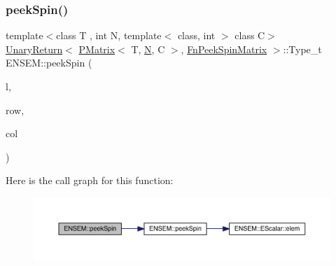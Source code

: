 \subsubsection{\texorpdfstring{peekSpin()}{peekSpin()}\hspace{0.1cm}{\footnotesize\ttfamily [2/2]}}
{\footnotesize\ttfamily template$<$class T , int N, template$<$ class, int $>$ class C$>$ \\
\mbox{\hyperlink{structENSEM_1_1UnaryReturn}{Unary\+Return}}$<$ \mbox{\hyperlink{classENSEM_1_1PMatrix}{P\+Matrix}}$<$ T, \mbox{\hyperlink{adat__devel_2lib_2hadron_2operator__name__util_8cc_a7722c8ecbb62d99aee7ce68b1752f337}{N}}, C $>$, \mbox{\hyperlink{structENSEM_1_1FnPeekSpinMatrix}{Fn\+Peek\+Spin\+Matrix}} $>$\+::Type\+\_\+t E\+N\+S\+E\+M\+::peek\+Spin (\begin{DoxyParamCaption}\item[{const \mbox{\hyperlink{classENSEM_1_1PMatrix}{P\+Matrix}}$<$ T, \mbox{\hyperlink{adat__devel_2lib_2hadron_2operator__name__util_8cc_a7722c8ecbb62d99aee7ce68b1752f337}{N}}, C $>$ \&}]{l,  }\item[{int}]{row,  }\item[{int}]{col }\end{DoxyParamCaption})\hspace{0.3cm}{\ttfamily [inline]}}

Here is the call graph for this function\+:\nopagebreak
\begin{figure}[H]
\begin{center}
\leavevmode
\includegraphics[width=350pt]{df/d0a/group__primmatrix_ga2efe19b2ef4dc4cbacc12117645bf8b8_cgraph}
\end{center}
\end{figure}
\mbox{\label{group__primmatrix_ga0cfeefefe2bd8b4e365ac10d8853664a}} 
